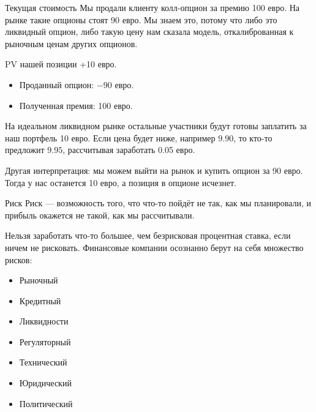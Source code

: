 \documentclass{beamer}
\begin{document}
\begin{frame}{Текущая стоимость}
\justify
Мы продали клиенту колл-опцион за премию 100 евро. На рынке такие опционы стоят 90 евро.  
Мы знаем это, потому что либо это ликвидный опцион, либо такую цену нам сказала модель, 
откалиброванная к рыночным ценам других опционов.

\justify
PV нашей позиции +10 евро.
\begin{itemize}
\item Проданный опцион: $-90$ евро.
\item Полученная премия: 100 евро.
\end{itemize}

\justify
На идеальном ликвидном рынке остальные участники будут готовы заплатить за наш портфель 
10 евро. Если цена будет ниже, например $9.90$, то кто-то предложит $9.95$, рассчитывая 
заработать 0.05 евро.

\justify
Другая интерпретация: мы можем выйти на рынок и купить опцион за 90 евро. Тогда у нас 
останется 10 евро, а позиция в опционе исчезнет. 
\end{frame}



\begin{frame}{Риск}
\justify
Риск --- возможность того, что что-то пойдёт не так, как мы планировали, и 	прибыль окажется не такой, как мы рассчитывали.

\justify
Нельзя заработать что-то большее, чем безрисковая процентная ставка, если ничем не рисковать. Финансовые компании осознанно берут на себя множество рисков:
\begin{itemize}
\item Рыночный
\item Кредитный
\item Ликвидности
\item Регуляторный
\item Технический
\item Юридический
\item Политический
\end{itemize}
\end{frame}
\end{document}
